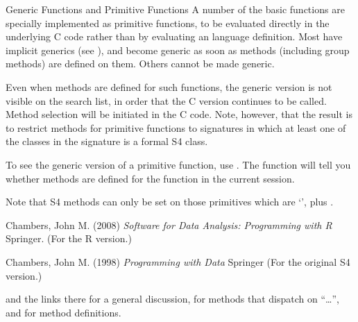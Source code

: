 \begin{Section}{Generic Functions and Primitive Functions}
A number of the basic \R{} functions are specially implemented as
primitive functions, to be evaluated directly in the underlying C code
rather than by evaluating an \R{} language definition.  Most have
implicit generics (see ), and become
generic as soon as methods (including group methods) are defined on
them.  Others cannot be made generic.

Even when methods are defined for such functions, the generic version
is not visible on the search list, in order that the C version
continues to be called.  Method selection will be initiated in the C
code.  Note, however, that the result is to restrict methods for
primitive functions to signatures in which at least one of the classes
in the signature is a formal S4 class.

To see the generic version of a primitive function, use
.  The function
 will tell you whether methods are defined
for the function in the current session.

Note that S4 methods can only be set on those primitives which are
`', plus \code{\%*\%}.
\end{Section}
%
\begin{References}\relax
Chambers, John M. (2008)
\emph{Software for Data Analysis: Programming with R}
Springer.  (For the R version.)

Chambers, John M. (1998)
\emph{Programming with Data}
Springer (For the original S4 version.)
\end{References}
%
\begin{SeeAlso}\relax
{} and the links there for a general discussion,
 for methods that dispatch on
``\dots'', and  for method definitions.
\end{SeeAlso}
%

